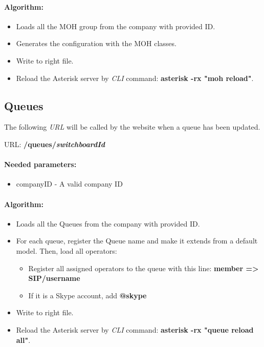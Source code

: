 \paragraph{Algorithm:}
\begin{itemize}
	\item Loads all the MOH group from the company with provided ID.
	\item Generates the configuration with the MOH classes. 
	\item Write to right file.
	\item Reload the Asterisk server by \textit{CLI} command: \textbf{asterisk -rx "moh reload"}.

\end{itemize}




\subsection{Queues}
The following \textit{URL} will be called by the website when a queue has been updated.
\newline


URL: \textbf{/queues/{\textit{switchboardId}}}

\paragraph{Needed parameters:}
\begin{itemize}
\item {companyID} - A valid company ID
\end{itemize}


\paragraph{Algorithm:}
\begin{itemize}
	\item Loads all the Queues from the company with provided ID.
	\item For each queue, register the Queue name and make it extends from a default model. Then, load all operators:
	\begin{itemize}
		\item Register all assigned operators to the queue with this line: \textbf{member => SIP/username}
		\item If it is a Skype account, add \textbf{@skype}
\end{itemize}	 
	\item Write to right file.
	\item Reload the Asterisk server by \textit{CLI} command: \textbf{asterisk -rx "queue reload all"}.

\end{itemize}





